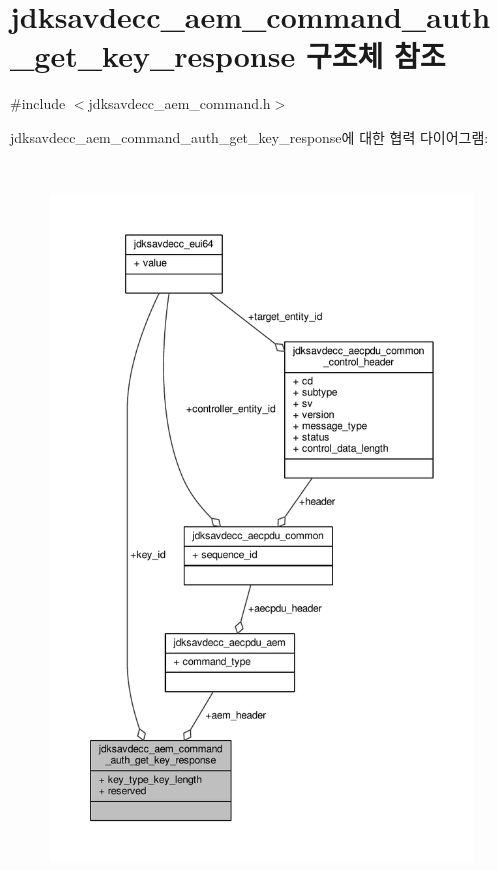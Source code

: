 \hypertarget{structjdksavdecc__aem__command__auth__get__key__response}{}\section{jdksavdecc\+\_\+aem\+\_\+command\+\_\+auth\+\_\+get\+\_\+key\+\_\+response 구조체 참조}
\label{structjdksavdecc__aem__command__auth__get__key__response}


{\ttfamily \#include $<$jdksavdecc\+\_\+aem\+\_\+command.\+h$>$}



jdksavdecc\+\_\+aem\+\_\+command\+\_\+auth\+\_\+get\+\_\+key\+\_\+response에 대한 협력 다이어그램\+:
\nopagebreak
\begin{figure}[H]
\begin{center}
\leavevmode
\includegraphics[height=550pt]{structjdksavdecc__aem__command__auth__get__key__response__coll__graph}
\end{center}
\end{figure}
